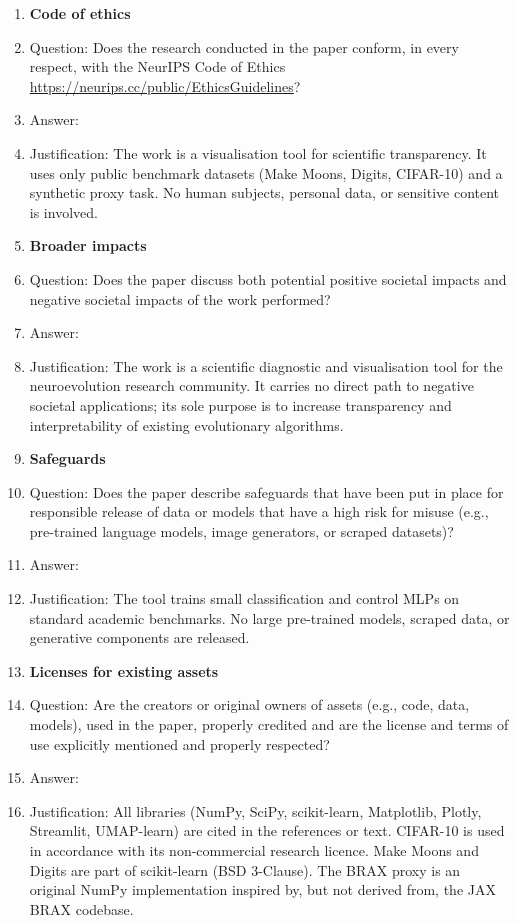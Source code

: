 \begin{enumerate}
\item {\bf Code of ethics}
    \item[] Question: Does the research conducted in the paper conform, in every respect, with the NeurIPS Code of Ethics \url{https://neurips.cc/public/EthicsGuidelines}?
    \item[] Answer: \answerYes{}
    \item[] Justification: The work is a visualisation tool for scientific transparency. It uses only public benchmark datasets (Make Moons, Digits, CIFAR-10) and a synthetic proxy task. No human subjects, personal data, or sensitive content is involved.

\item {\bf Broader impacts}
    \item[] Question: Does the paper discuss both potential positive societal impacts and negative societal impacts of the work performed?
    \item[] Answer: \answerNA{}
    \item[] Justification: The work is a scientific diagnostic and visualisation tool for the neuroevolution research community. It carries no direct path to negative societal applications; its sole purpose is to increase transparency and interpretability of existing evolutionary algorithms.

\item {\bf Safeguards}
    \item[] Question: Does the paper describe safeguards that have been put in place for responsible release of data or models that have a high risk for misuse (e.g., pre-trained language models, image generators, or scraped datasets)?
    \item[] Answer: \answerNA{}
    \item[] Justification: The tool trains small classification and control MLPs on standard academic benchmarks. No large pre-trained models, scraped data, or generative components are released.

\item {\bf Licenses for existing assets}
    \item[] Question: Are the creators or original owners of assets (e.g., code, data, models), used in the paper, properly credited and are the license and terms of use explicitly mentioned and properly respected?
    \item[] Answer: \answerYes{}
    \item[] Justification: All libraries (NumPy, SciPy, scikit-learn, Matplotlib, Plotly, Streamlit, UMAP-learn) are cited in the references or text. CIFAR-10 is used in accordance with its non-commercial research licence. Make Moons and Digits are part of scikit-learn (BSD 3-Clause). The BRAX proxy is an original NumPy implementation inspired by, but not derived from, the JAX BRAX codebase.


\end{enumerate}
